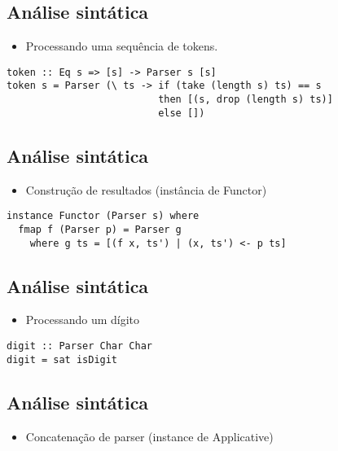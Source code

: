 \documentclass[11pt]{article}
\begin{document}
\subsection*{Análise sintática}
\label{sec:org752aaff}

\begin{itemize}
\item Processando uma sequência de tokens.
\end{itemize}

\begin{verbatim}
token :: Eq s => [s] -> Parser s [s]
token s = Parser (\ ts -> if (take (length s) ts) == s 
                          then [(s, drop (length s) ts)]
                          else [])
\end{verbatim}
\subsection*{Análise sintática}
\label{sec:org32af6aa}

\begin{itemize}
\item Construção de resultados (instância de Functor)
\end{itemize}

\begin{verbatim}
instance Functor (Parser s) where 
  fmap f (Parser p) = Parser g 
    where g ts = [(f x, ts') | (x, ts') <- p ts]
\end{verbatim}
\subsection*{Análise sintática}
\label{sec:orgdb57a0e}

\begin{itemize}
\item Processando um dígito
\end{itemize}

\begin{verbatim}
digit :: Parser Char Char 
digit = sat isDigit
\end{verbatim}
\subsection*{Análise sintática}
\label{sec:org470cdb3}

\begin{itemize}
\item Concatenação de parser (instance de Applicative)
\end{itemize}
\end{document}
